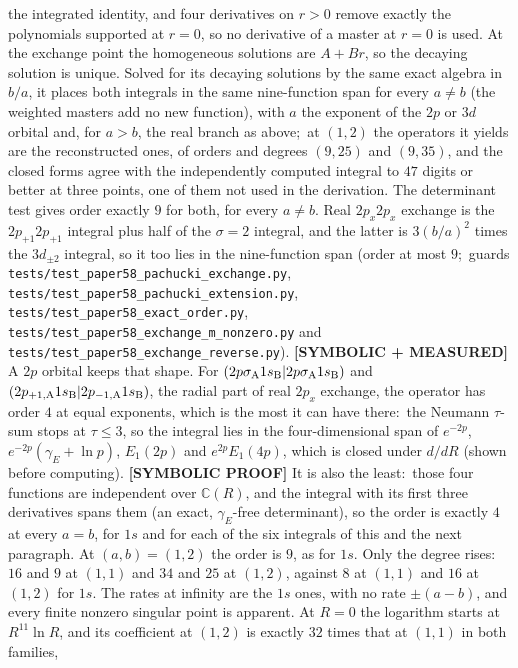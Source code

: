 \documentclass[aps,pra,twocolumn,superscriptaddress,longbibliography]{revtex4-2}
\begin{document}
the integrated identity, and four derivatives on $r>0$ remove exactly the polynomials
supported at $r=0$, so no derivative of a master at $r=0$ is used.  At the exchange point
the homogeneous solutions are $A+Br$, so the decaying solution is unique.  Solved for its decaying
solutions by the same exact algebra in $b/a$, it places both integrals in the
same nine-function span for every $a\neq b$ (the weighted masters add no new
function), with $a$ the exponent of the $2p$ or $3d$ orbital and, for $a>b$, the real
branch as above;\ at $(1,2)$ the
operators it yields are the reconstructed ones, of orders and degrees $(9,25)$
and $(9,35)$, and the closed forms agree with the independently computed
integral to $47$ digits or better at three points, one of them not used in the
derivation.  The determinant test gives order exactly $9$ for both, for every
$a\neq b$.  Real $2p_x2p_x$ exchange is the $2p_{+1}2p_{+1}$ integral plus half of
the $\sigma=2$ integral, and the latter is $3(b/a)^2$ times the $3d_{\pm2}$
integral, so it too lies in the nine-function span (order at most $9$;\ guards
\texttt{tests/test\_paper58\_pachucki\_exchange.py},
\texttt{tests/test\_paper58\_pachucki\_extension.py},
\texttt{tests/test\_paper58\_exact\_order.py},
\texttt{tests/test\_paper58\_exchange\_m\_nonzero.py} and
\texttt{tests/test\_paper58\_exchange\_reverse.py}).
\textbf{[SYMBOLIC + MEASURED]} A $2p$ orbital keeps that shape.  For
$(2p\sigma_{\rm A}1s_{\rm B}|2p\sigma_{\rm A}1s_{\rm B})$ and
$(2p_{+1,{\rm A}}1s_{\rm B}|2p_{-1,{\rm A}}1s_{\rm B})$, the radial part of real
$2p_x$ exchange, the operator has order $4$ at equal exponents, which is the most it can
have there:\ the Neumann $\tau$-sum stops at $\tau\le3$, so the integral lies in the four-dimensional span of
$e^{-2p}$, $e^{-2p}(\gamma_E+\ln p)$, $E_1(2p)$ and $e^{2p}E_1(4p)$, which is closed under
$d/dR$ (shown before computing).  \textbf{[SYMBOLIC PROOF]} It is also the least:\ those four
functions are independent over $\mathbb{C}(R)$, and the integral with its first three derivatives
spans them (an exact, $\gamma_E$-free determinant), so the order is exactly $4$ at every $a=b$,
for $1s$ and for each of the six integrals of this and the next paragraph.  At $(a,b)=(1,2)$ the order is $9$, as for $1s$.  Only the degree rises:\ $16$ and $9$ at $(1,1)$ and $34$ and $25$ at $(1,2)$, against $8$ at
$(1,1)$ and $16$ at $(1,2)$ for $1s$.  The rates at infinity are the $1s$ ones, with no rate $\pm(a-b)$, and every
finite nonzero singular point is apparent.  At $R=0$ the logarithm starts at $R^{11}\ln R$,
and its coefficient at $(1,2)$ is exactly $32$ times that at $(1,1)$ in both families,
\end{document}
